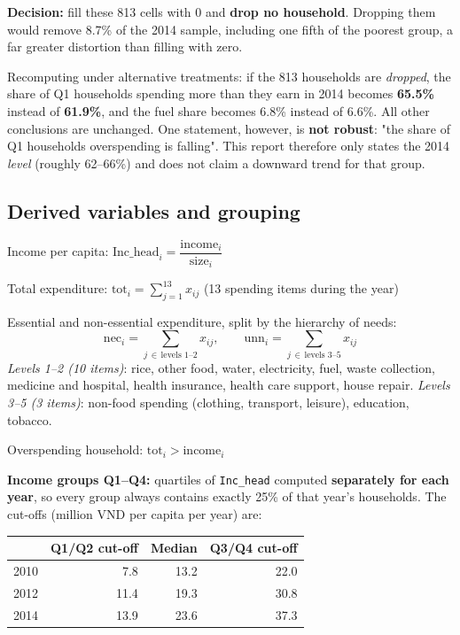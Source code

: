 \documentclass[11pt,a4paper]{article}
\newcommand{\n}[1]{\textbf{#1}}
\begin{document}
\textbf{Decision:} fill these 813 cells with 0 and \n{drop no household}. Dropping them would remove 8.7\% of the 2014 sample, including one fifth of the poorest group, a far greater distortion than filling with zero.

\begin{luuy}
Recomputing under alternative treatments: if the 813 households are \emph{dropped}, the share of Q1 households spending more than they earn in 2014 becomes \n{65.5\%} instead of \n{61.9\%}, and the fuel share becomes 6.8\% instead of 6.6\%. All other conclusions are unchanged. One statement, however, is \n{not robust}: "the share of Q1 households overspending is falling". This report therefore only states the 2014 \emph{level} (roughly 62–66\%) and does not claim a downward trend for that group.
\end{luuy}

\subsection{Derived variables and grouping}

\begin{ct}
Income per capita: \quad $\text{Inc\_head}_i = \dfrac{\text{income}_i}{\text{size}_i}$
\smallskip

Total expenditure: \quad $\text{tot}_i = \sum_{j=1}^{13} x_{ij}$ \quad (13 spending items during the year)
\smallskip

Essential and non-essential expenditure, split by the hierarchy of needs:
\[\text{nec}_i = \!\!\sum_{j \,\in\, \text{levels 1–2}}\!\! x_{ij}, \qquad \text{unn}_i = \!\!\sum_{j \,\in\, \text{levels 3–5}}\!\! x_{ij}\]
\emph{Levels 1–2 (10 items)}: rice, other food, water, electricity, fuel, waste collection, medicine and hospital, health insurance, health care support, house repair. \quad \emph{Levels 3–5 (3 items)}: non-food spending (clothing, transport, leisure), education, tobacco.
\smallskip

Overspending household: \quad $\text{tot}_i > \text{income}_i$
\end{ct}

\n{Income groups Q1–Q4:} quartiles of \texttt{Inc\_head} computed \n{separately for each year}, so every group always contains exactly 25\% of that year's households. The cut-offs (million VND per capita per year) are:

\begin{table}[H]\centering\small
\begin{tabular}{lrrr}
\toprule
& Q1/Q2 cut-off & Median & Q3/Q4 cut-off\\
\midrule
2010 & 7.8 & 13.2 & 22.0\\
2012 & 11.4 & 19.3 & 30.8\\
2014 & 13.9 & 23.6 & 37.3\\
\bottomrule
\end{tabular}
\end{table}
\end{document}
